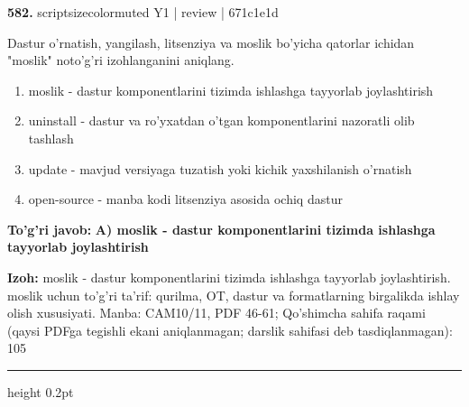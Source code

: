 \documentclass[10pt,a4paper]{article}
\begin{document}
{\bfseries\sffamily\color{ink} 582.} {scriptsizecolor{muted} Y1 | review | 671c1e1d}
\par
Dastur o'rnatish, yangilash, litsenziya va moslik bo'yicha qatorlar ichidan "moslik" noto'g'ri izohlanganini aniqlang.
\begin{enumerate}[label=\Alph*),leftmargin=9mm]
\item moslik - dastur komponentlarini tizimda ishlashga tayyorlab joylashtirish
\item uninstall - dastur va ro'yxatdan o'tgan komponentlarini nazoratli olib tashlash
\item update - mavjud versiyaga tuzatish yoki kichik yaxshilanish o'rnatish
\item open-source - manba kodi litsenziya asosida ochiq dastur
\end{enumerate}
\begin{tcolorbox}[enhanced,breakable,colback=teal!4,colframe=teal!60!black,boxrule=0.45pt,arc=1.2mm,left=2.7mm,right=2.7mm,top=1.8mm,bottom=1.8mm,before skip=2mm,after skip=2mm]
{\bfseries\sffamily\color{teal}To'g'ri javob:} \textbf{A) moslik - dastur komponentlarini tizimda ishlashga tayyorlab joylashtirish}
\par\smallskip
{\bfseries Izoh:} moslik - dastur komponentlarini tizimda ishlashga tayyorlab joylashtirish. moslik uchun to'g'ri ta'rif: qurilma, OT, dastur va formatlarning birgalikda ishlay olish xususiyati. Manba: CAM10/11, PDF 46-61; Qo'shimcha sahifa raqami (qaysi PDFga tegishli ekani aniqlanmagan; darslik sahifasi deb tasdiqlanmagan): 105
\end{tcolorbox}
\vspace{2mm}\hrule height 0.2pt\vspace{3mm}
\end{document}
